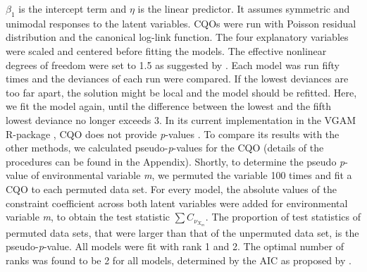\documentclass[a4paper,11pt]{article}
\begin{document}
		$\beta_1$ is the intercept term and $\eta$ is the linear predictor. 
        It assumes symmetric and unimodal responses to the latent variables.
		CQOs were run with Poisson residual distribution and the canonical log-link function.
		The four explanatory variables were scaled and centered before fitting the models.
		The effective nonlinear degrees of freedom were set to 1.5 as suggested by \citet{yee2015vector}.
		Each model was run fifty times and the deviances of each run were compared. 
		If the lowest deviances are too far apart, the solution might be local and the model should be refitted.  
		Here, we fit the model again, until the difference between the lowest and the fifth lowest deviance no longer exceeds 3. 
        In its current implementation in the VGAM R-package \citep{VGAM19}, CQO does not provide \textit{p}-values \cite[but see][]{yee2010vglms}. 
        To compare its results with the other methods, we calculated pseudo-\textit{p}-values for the CQO (details of the procedures can be found in the 
        Appendix).
        Shortly, to determine the pseudo \textit{p}-value of environmental variable \textit{m}, we permuted the variable 100 times and fit a CQO to each permuted data set. 
        For every model, the absolute values of the constraint coefficient across both latent variables were added for environmental variable \textit{m}, to obtain the test statistic $\sum C_{\nu_{X_{m}}}$. 
        The proportion of test statistics of permuted data sets, that were larger than that of the unpermuted data set, is the pseudo-\textit{p}-value. 
	    All models were fit with rank 1 and 2.
		The optimal number of ranks was found to be 2 for all models, determined by the AIC as proposed by \citet{yee2003reduced}.\\

\end{document}
